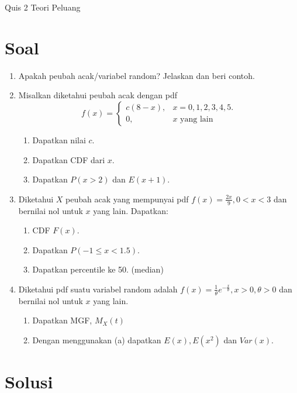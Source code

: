 \documentclass[12pt,a4paper]{article}
\begin{document}
\begin{center}
  \Large Quis 2 Teori Peluang
\end{center}

\section*{Soal}
\begin{enumerate}
  \item Apakah peubah acak/variabel random? Jelaskan dan beri contoh.

  \item Misalkan diketahui peubah acak dengan pdf
        \[
          f(x) = \begin{cases}
            c(8-x), & x = 0, 1, 2, 3, 4, 5. \\
            0,      & x \text{ yang lain}
          \end{cases}
        \]
        \begin{enumerate}
          \item Dapatkan nilai $c$.
          \item Dapatkan CDF dari $x$.
          \item Dapatkan $P(x>2)$ dan $E(x+1)$.
        \end{enumerate}

  \item Diketahui $X$ peubah acak yang mempunyai pdf
        $f(x) = \frac{2x}{9}, 0 < x < 3$ dan bernilai nol untuk $x$ yang lain. Dapatkan:
        \begin{enumerate}
          \item CDF $F(x)$.
          \item Dapatkan $P(-1 \le x < 1.5)$.
          \item Dapatkan percentile ke 50. (median)
        \end{enumerate}

  \item Diketahui pdf suatu variabel random adalah $f(x) = \frac{1}{\theta} e^{-\frac{x}{\theta}}, x > 0, \theta > 0$ dan bernilai nol untuk $x$ yang lain.
        \begin{enumerate}
          \item Dapatkan MGF, $M_X(t)$
          \item Dengan menggunakan (a) dapatkan $E(x), E(x^2)$ dan $Var(x)$.
        \end{enumerate}
\end{enumerate}

\newpage
\section*{Solusi}
\end{document}
